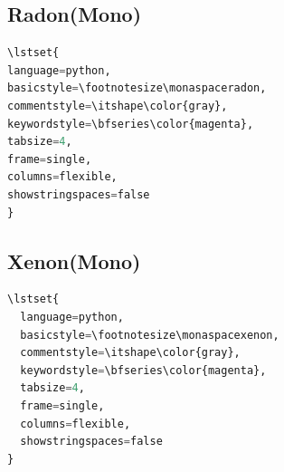 \documentclass[a4paper]{scrartcl}
\begin{document}




\pagebreak

\subsection{Radon(Mono)}

\begin{lstlisting}[language=python,basicstyle=\footnotesize\monaspaceradon,commentstyle=\itshape\color{gray},keywordstyle=\bfseries\color{magenta},tabsize=4,frame=single,columns=flexible,showstringspaces=false]
\lstset{
language=python,
basicstyle=\footnotesize\monaspaceradon,
commentstyle=\itshape\color{gray},
keywordstyle=\bfseries\color{magenta},
tabsize=4,
frame=single,
columns=flexible,
showstringspaces=false
}
\end{lstlisting}





\pagebreak

\subsection{Xenon(Mono)}

\begin{lstlisting}[language=python,basicstyle=\footnotesize\monaspacexenon,commentstyle=\itshape\color{gray},keywordstyle=\bfseries\color{magenta},tabsize=4,frame=single,columns=flexible,showstringspaces=false]
\lstset{
  language=python,
  basicstyle=\footnotesize\monaspacexenon,
  commentstyle=\itshape\color{gray},
  keywordstyle=\bfseries\color{magenta},
  tabsize=4,
  frame=single,
  columns=flexible,
  showstringspaces=false
}
\end{lstlisting}
\end{document}
